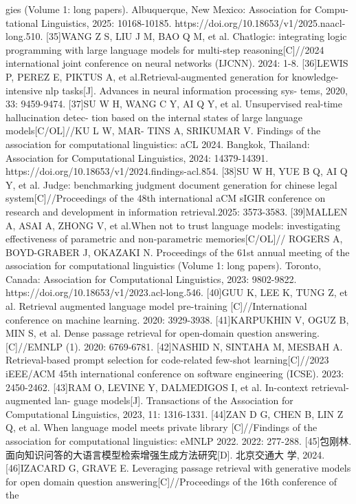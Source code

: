 \documentclass[12pt,a4paper,openright,UTF8]{ctexbook}
\begin{document}
gies (Volume 1: long papers). Albuquerque, New Mexico: Association for Compu-
tational Linguistics, 2025: 10168-10185. https://doi.org/10.18653/v1/2025.naacl-
long.510.
[35]WANG Z S, LIU J M, BAO Q M, et al. Chatlogic: integrating logic programming
with large language models for multi-step reasoning[C]//2024 international joint
conference on neural networks (IJCNN). 2024: 1-8.
[36]LEWIS P, PEREZ E, PIKTUS A, et al.Retrieval-augmented generation for
knowledge-intensive nlp tasks[J]. Advances in neural information processing sys-
tems, 2020, 33: 9459-9474.
[37]SU W H, WANG C Y, AI Q Y, et al. Unsupervised real-time hallucination detec-
tion based on the internal states of large language models[C/OL]//KU L W, MAR-
TINS A, SRIKUMAR V. Findings of the association for computational linguistics:
aCL 2024. Bangkok, Thailand: Association for Computational Linguistics, 2024:
14379-14391. https://doi.org/10.18653/v1/2024.findings-acl.854.
[38]SU W H, YUE B Q, AI Q Y, et al. Judge: benchmarking judgment document
generation for chinese legal system[C]//Proceedings of the 48th international aCM
sIGIR conference on research and development in information retrieval.2025:
3573-3583.
[39]MALLEN A, ASAI A, ZHONG V, et al.When not to trust language models:
investigating effectiveness of parametric and non-parametric memories[C/OL]//
ROGERS A, BOYD-GRABER J, OKAZAKI N. Proceedings of the 61st annual
meeting of the association for computational linguistics (Volume 1: long papers).
Toronto, Canada: Association for Computational Linguistics, 2023: 9802-9822.
https://doi.org/10.18653/v1/2023.acl-long.546.
[40]GUU K, LEE K, TUNG Z, et al. Retrieval augmented language model pre-training
[C]//International conference on machine learning. 2020: 3929-3938.
[41]KARPUKHIN V, OGUZ B, MIN S, et al. Dense passage retrieval for open-domain
question answering.[C]//EMNLP (1). 2020: 6769-6781.
[42]NASHID N, SINTAHA M, MESBAH A. Retrieval-based prompt selection for
code-related few-shot learning[C]//2023 iEEE/ACM 45th international conference
on software engineering (ICSE). 2023: 2450-2462.
[43]RAM O, LEVINE Y, DALMEDIGOS I, et al. In-context retrieval-augmented lan-
guage models[J]. Transactions of the Association for Computational Linguistics,
2023, 11: 1316-1331.
[44]ZAN D G, CHEN B, LIN Z Q, et al. When language model meets private library
[C]//Findings of the association for computational linguistics: eMNLP 2022. 2022:
277-288.
[45]包刚林. 面向知识问答的大语言模型检索增强生成方法研究[D]. 北京交通大
学, 2024.
[46]IZACARD G, GRAVE E. Leveraging passage retrieval with generative models
for open domain question answering[C]//Proceedings of the 16th conference of the
\end{document}
